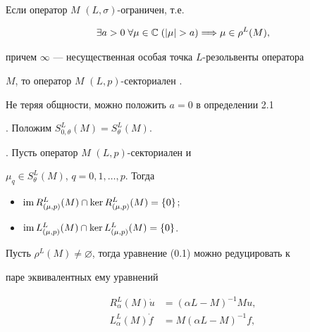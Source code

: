  


\begin{notem} Если оператор $M$ $(L,\sigma)$-ограничен, т.е. 


$$ 


\exists a>0\; \forall\mu\in\Bbb C\;(|\mu|>a)\Longrightarrow 


\mu\in\rho^L(M), 


$$ 


причем $\infty$ --- несущественная особая точка $L$-резольвенты оператора 


$M$, то оператор $M$ $(L,p)$-секториален \cite{Sv5}. 


\end{notem} 


 


\begin{notem} Не теряя общности, можно положить $a=0$ в определении 2.1 


\cite{Sv5}. Положим $S^L_{0,\theta}(M)=S^L_\theta(M)$. 


\end{notem} 


 


\begin{lemm} \cite{Sv5}. Пусть оператор $M$ $(L,p)$-секториален и 


$\mu_q\in S^L_\theta(M)$, $q=0,1,\dotsc,p$. Тогда 


\begin{itemize} 


\item[(i)] $\operatorname{im} R^L_{(\mu,p)}(M)\cap\ker R^L_{(\mu,p)}(M)=\{0\}$; 


\item[(ii)] $\operatorname{im} L^L_{(\mu,p)}(M)\cap\ker L^L_{(\mu,p)}(M)=\{0\}$. 


\end{itemize} 


\end{lemm} 


 


Пусть $\rho^L(M)\ne\varnothing$, тогда уравнение (0.1) можно редуцировать к 


паре эквивалентных ему уравнений 


\begin{align} 


R^L_\alpha(M)\Dot u &=(\alpha L-M)^{-1}Mu,\\ 


L^L_\alpha(M)\Dot f &=M(\alpha L-M)^{-1}f, 


\end{align} 


